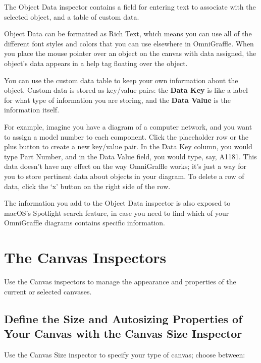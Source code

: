 \documentclass[../main.tex]{subfiles}
\begin{document}
\begin{ogpro}
  The Object Data inspector contains a field for entering text to associate with the selected
  object, and a table of custom data.


  Object Data can be formatted as Rich Text, which means you can use all of the different font
  styles and colors that you can use elsewhere in OmniGraffle. When you place the mouse
  pointer over an object on the canvas with data assigned, the object's data appears in a help
  tag floating over the object.

  You can use the custom data table to keep your own information about the object. Custom data
  is stored as key/value pairs: the \textbf{Data Key} is like a label for what type of
  information you are storing, and the \textbf{Data Value} is the information itself.

  For example, imagine you have a diagram of a computer network, and you want to assign a model
  number to each component. Click the placeholder row or the plus button to create a new
  key/value pair. In the Data Key column, you would type Part Number, and in the Data Value
  field, you would type, say, A1181. This data doesn't have any effect on the way OmniGraffle
  works; it's just a way for you to store pertinent data about objects in your diagram. To
  delete a row of data, click the `x' button on the right side of the row.

  The information you add to the Object Data inspector is also exposed to macOS's Spotlight
  search feature, in case you need to find which of your OmniGraffle diagrams contains
  specific information.
\end{ogpro}

\section{The Canvas Inspectors}

Use the Canvas inspectors to manage the appearance and properties of the current or selected
canvases.

\subsection{Define the Size and Autosizing Properties of Your Canvas with the Canvas Size
Inspector}

Use the Canvas Size inspector to specify your type of canvas; choose between:
\end{document}
